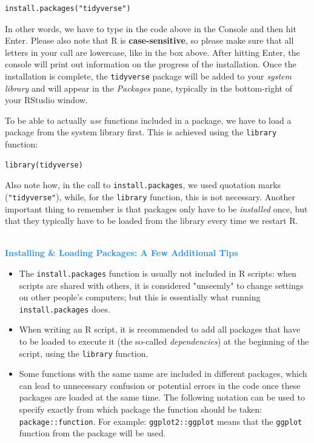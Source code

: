 \begin{lstlisting}
install.packages("tidyverse")
\end{lstlisting}

In other words, we have to type in the code above in the Console and then hit Enter. Please also note that \textsf{R} is \textbf{case-sensitive}, so please make sure that all letters in your call are lowercase, like in the box above. After hitting Enter, the console will print out information on the progress of the installation. Once the installation is complete, the \texttt{tidyverse} package will be added to your \emph{system library} and will appear in the \emph{Packages} pane, typically in the bottom-right of your RStudio window.

To be able to actually \emph{use} functions included in a package, we have to load a package from the system library first. This is achieved using the \texttt{library} function:

\begin{lstlisting}
library(tidyverse)
\end{lstlisting}

Also note how, in the call to \texttt{install.packages}, we used quotation marks (\texttt{"tidyverse"}), while, for the \texttt{library} function, this is not necessary. Another important thing to remember is that packages only have to be \emph{installed} once, but that they typically have to be loaded from the library every time we restart \textsf{R}.

\begin{box-info} \\

\textcolor{dodgerblue}{\textbf{Installing \& Loading Packages: A Few Additional Tips}}

\begin{itemize}
    \item The \texttt{install.packages} function is usually not included in \textsf{R} scripts: when scripts are shared with others, it is considered "unseemly" to change settings on other people's computers; but this is essentially what running \texttt{install.packages} does.
    \item When writing an \textsf{R} script, it is recommended to add all packages that have to be loaded to execute it (the so-called \emph{dependencies}) at the beginning of the script, using the \texttt{library} function.
    \item Some functions with the same name are included in different packages, which can lead to unnecessary confusion or potential errors in the code once these packages are loaded at the same time. The following notation can be used to specify exactly from which package the function should be taken: \texttt{package::function}. For example: \texttt{ggplot2::ggplot} means that the \texttt{ggplot} function from the \texttt{} package will be used.
\end{itemize}
\end{box-info}

